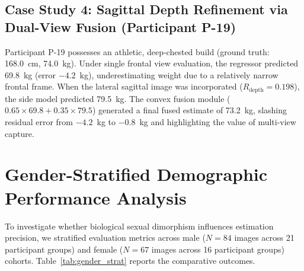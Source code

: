 \documentclass[12pt,a4paper,oneside]{report}
\begin{document}
\subsection{Case Study 4: Sagittal Depth Refinement via Dual-View Fusion (Participant P-19)}
Participant P-19 possesses an athletic, deep-chested build (ground truth: 168.0~cm, 74.0~kg). Under single frontal view evaluation, the regressor predicted 69.8~kg (error $-4.2$~kg), underestimating weight due to a relatively narrow frontal frame. When the lateral sagittal image was incorporated ($R_{\text{depth}} = 0.198$), the side model predicted 79.5~kg. The convex fusion module ($0.65 \times 69.8 + 0.35 \times 79.5$) generated a final fused estimate of 73.2~kg, slashing residual error from $-4.2$~kg to $-0.8$~kg and highlighting the value of multi-view capture.

\section{Gender-Stratified Demographic Performance Analysis}
To investigate whether biological sexual dimorphism influences estimation precision, we stratified evaluation metrics across male ($N=84$ images across 21 participant groups) and female ($N=67$ images across 16 participant groups) cohorts. Table~\ref{tab:gender_strat} reports the comparative outcomes.

\begin{table}[H]
\centering
\caption{Gender-Stratified Height and Weight Performance Comparison}
\label{tab:gender_strat}
\end{table}
\end{document}
